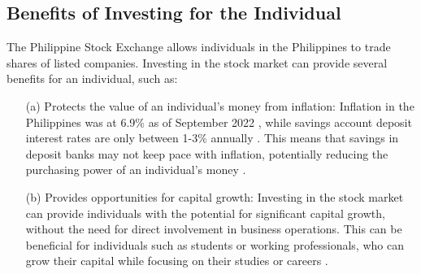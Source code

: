\subsection{Benefits of Investing for the Individual}
The Philippine Stock Exchange allows individuals in the Philippines
 to trade shares of listed companies. Investing in the stock market can provide 
 several benefits for an individual, such as:
\begin{itemize}
    \item[(a)] Protects the value of an individual's money from inflation: Inflation 
    in the Philippines was at 6.9\% as of September 2022 
    \cite{tradingEconomics}, 
    while savings account deposit interest rates are only between 1-3\% annually 
    \cite{BSP19}. 
    This means that savings in deposit banks may not keep pace with inflation, 
    potentially reducing the purchasing power of an individual's money 
    \cite{RBC, EdwardJones}.
    \item[(b)] Provides opportunities for capital growth: 
    Investing in the stock market can provide individuals with the potential 
    for significant capital growth, without the need for direct 
    involvement in business operations. This can be beneficial for individuals
    such as students or working professionals, who can grow their capital while 
    focusing on their studies or careers
    \cite{USSecAndExComm}.
\end{itemize}